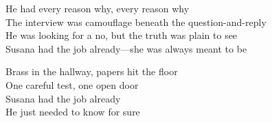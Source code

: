 \begin{lyrics}
He had every reason why, every reason why\\
The interview was camouflage beneath the question-and-reply\\
He was looking for a no, but the truth was plain to see\\
Susana had the job already—she was always meant to be

Brass in the hallway, papers hit the floor\\
One careful test, one open door\\
Susana had the job already\\
He just needed to know for sure
\end{lyrics}

